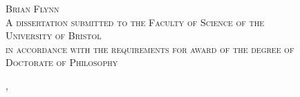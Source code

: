 \begin{titlepage}
{    }%
    \HRule %
    \vspace{1.5cm}
    
    
    \vspace{0.2cm}
    \textsc{\LARGE Brian Flynn}\\[1.5cm]
    
    \vspace{2.2cm}
    \textsc{
        \normalsize A dissertation submitted to the Faculty of Science of the \\ 
        \vspace{0.1cm}
        \LARGE University of Bristol \\    
        \vspace{0.1cm}
        \normalsize in accordance with the requirements for award of the degree of \\
        \vspace{0.1cm}
        \LARGE Doctorate of Philosophy \\
        \vspace{0.1cm}
    }
    \vspace{1.5cm}
    
    
    {\Large \monthname, \the\year}\\[1cm] %
    
    
    
    \end{titlepage}